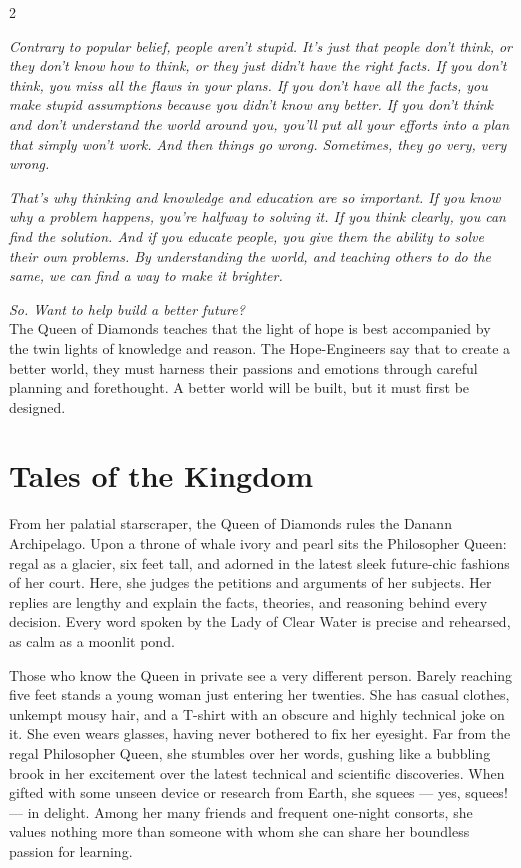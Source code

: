 \label{scha:Diamonds}\begin{multicols}{2}\raggedcolumns

\noindent\textit{Contrary to popular belief, people aren't stupid. It's just that people don't think, or they don't know how to think, or they just didn't have the right facts. If you don't think, you miss all the flaws in your plans. If you don't have all the facts, you make stupid assumptions because you didn't know any better. If you don't think and don't understand the world around you, you'll put all your efforts into a plan that simply won't work. And then things go wrong. Sometimes, they go very, very wrong.}

\textit{That's why thinking and knowledge and education are so important. If you know why a problem happens, you're halfway to solving it. If you think clearly, you can find the solution. And if you educate people, you give them the ability to solve their own problems. By understanding the world, and teaching others to do the same, we can find a way to make it brighter.}

\textit{So. Want to help build a better future?}\\

\noindent The Queen of Diamonds teaches that the light of hope is best accompanied by the twin lights of knowledge and reason. The Hope-Engineers say that to create a better world, they must harness their passions and emotions through careful planning and forethought. A better world will be built, but it must first be designed. 

\section*{Tales of the Kingdom}

From her palatial starscraper, the Queen of Diamonds rules the Danann Archipelago. Upon a throne of whale ivory and pearl sits the Philosopher Queen: regal as a glacier, six feet tall, and adorned in the latest sleek future-chic fashions of her court. Here, she judges the petitions and arguments of her subjects. Her replies are lengthy and explain the facts, theories, and reasoning behind every decision. Every word spoken by the Lady of Clear Water is precise and rehearsed, as calm as a moonlit pond.

Those who know the Queen in private see a very different person. Barely reaching five feet stands a young woman just entering her twenties. She has casual clothes, unkempt mousy hair, and a T-shirt with an obscure and highly technical joke on it. She even wears glasses, having never bothered to fix her eyesight. Far from the regal Philosopher Queen, she stumbles over her words, gushing like a bubbling brook in her excitement over the latest technical and scientific discoveries. When gifted with some unseen device or research from Earth, she squees — yes, squees! — in delight. Among her many friends and frequent one-night consorts, she values nothing more than someone with whom she can share her boundless passion for learning.


\end{multicols}
